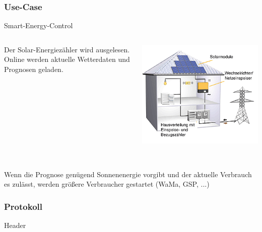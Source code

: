 \documentclass{beamer}
\begin{document}
\begin{frame} %
  \frametitle{ Use-Case } %
  \begin{block}{ Smart-Energy-Control }
  	\begin{columns}
			\begin{column}{6cm}
				\break
  			Der Solar-Energiezähler wird ausgelesen.\\
  			\break
  			Online werden aktuelle Wetterdaten und Prognosen geladen.\\
  		\end{column}
  		\begin{column}{3.5cm}
  			\includegraphics[scale=0.4]{Medien/solarHaus.png}\\ 
  		\end{column}
		\end{columns}
		\ \\
		\break
  	Wenn die Prognose genügend Sonnenenergie vorgibt und der aktuelle Verbrauch es zulässt, werden größere Verbraucher gestartet (WaMa, GSP, ...) 
		
  \end{block}
  
\end{frame}


\begin{frame} %
  \frametitle{ Protokoll } %
  \begin{block}{Header}
  	\vspace{0.5cm}
  	\begin{center}
  	\begin{bytefield}{24}
			\\
			\\
			
			\\
			\\
			\skippedwords\\
		\end{bytefield}
		\end{center}
		\vspace{0.3cm}
  \end{block}
\end{frame}
\end{document}
